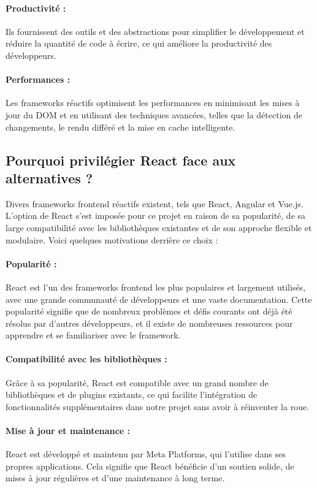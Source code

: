 \paragraph{Productivité :} Ils fournissent des outils et des abstractions pour simplifier le développement et réduire la quantité de code à écrire, ce qui améliore la productivité des développeurs.
\paragraph{Performances :} Les frameworks réactifs optimisent les performances en minimisant les mises à jour du \gls{DOM} et en utilisant des techniques avancées, telles que la détection de changements, le rendu différé et la mise en cache intelligente.

\subsection{Pourquoi privilégier React face aux alternatives ?}

Divers frameworks frontend réactifs existent, tels que React, Angular et Vue.js. L'option de React\cite{QuickStartReact} s'est imposée pour ce projet en raison de sa popularité, de sa large compatibilité avec les bibliothèques existantes et de son approche flexible et modulaire. Voici quelques motivations derrière ce choix :

\paragraph{Popularité :} React est l'un des frameworks frontend les plus populaires et largement utilisés, avec une grande communauté de développeurs et une vaste documentation. Cette popularité signifie que de nombreux problèmes et défis courants ont déjà été résolus par d'autres développeurs, et il existe de nombreuses ressources pour apprendre et se familiariser avec le framework.
\paragraph{Compatibilité avec les bibliothèques :} Grâce à sa popularité, React est compatible avec un grand nombre de bibliothèques et de plugins existants, ce qui facilite l'intégration de fonctionnalités supplémentaires dans notre projet sans avoir à réinventer la roue.
\paragraph{Mise à jour et maintenance :} React est développé et maintenu par Meta Platforms, qui l'utilise dans ses propres applications. Cela signifie que React bénéficie d'un soutien solide, de mises à jour régulières et d'une maintenance à long terme.

